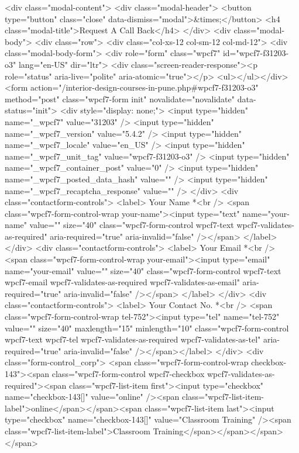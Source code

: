 {{{{{{{<div class="modal-content">
<div class="modal-header">
<button type="button" class="close" data-dismiss="modal">&times;</button>
<h4 class="modal-title">Request A Call Back</h4>
</div>
<div class="modal-body">
<div class="row">
<div class="col-xs-12 col-sm-12 col-md-12">
<div class="modal-body-form">
<div role="form" class="wpcf7" id="wpcf7-f31203-o3" lang="en-US" dir="ltr">
<div class="screen-reader-response"><p role="status" aria-live="polite" aria-atomic="true"></p> <ul></ul></div>
<form action="/interior-design-courses-in-pune.php#wpcf7-f31203-o3" method="post" class="wpcf7-form init" novalidate="novalidate" data-status="init">
<div style="display: none;">
<input type="hidden" name="_wpcf7" value="31203" />
<input type="hidden" name="_wpcf7_version" value="5.4.2" />
<input type="hidden" name="_wpcf7_locale" value="en_US" />
<input type="hidden" name="_wpcf7_unit_tag" value="wpcf7-f31203-o3" />
<input type="hidden" name="_wpcf7_container_post" value="0" />
<input type="hidden" name="_wpcf7_posted_data_hash" value="" />
<input type="hidden" name="_wpcf7_recaptcha_response" value="" />
</div>
<div class="contactform-controls">
<label> Your Name *<br />
<span class="wpcf7-form-control-wrap your-name"><input type="text" name="your-name" value="" size="40" class="wpcf7-form-control wpcf7-text wpcf7-validates-as-required" aria-required="true" aria-invalid="false" /></span> </label>
</div>
<div class="contactform-controls">
<label> Your Email *<br />
<span class="wpcf7-form-control-wrap your-email"><input type="email" name="your-email" value="" size="40" class="wpcf7-form-control wpcf7-text wpcf7-email wpcf7-validates-as-required wpcf7-validates-as-email" aria-required="true" aria-invalid="false" /></span> </label>
</div>
<div class="contactform-controls">
<label> Your Contact No. *<br />
<span class="wpcf7-form-control-wrap tel-752"><input type="tel" name="tel-752" value="" size="40" maxlength="15" minlength="10" class="wpcf7-form-control wpcf7-text wpcf7-tel wpcf7-validates-as-required wpcf7-validates-as-tel" aria-required="true" aria-invalid="false" /></span></label>
</div>
<div class="form-control_corp">
<span class="wpcf7-form-control-wrap checkbox-143"><span class="wpcf7-form-control wpcf7-checkbox wpcf7-validates-as-required"><span class="wpcf7-list-item first"><input type="checkbox" name="checkbox-143[]" value="online" /><span class="wpcf7-list-item-label">online</span></span><span class="wpcf7-list-item last"><input type="checkbox" name="checkbox-143[]" value="Classroom Training" /><span class="wpcf7-list-item-label">Classroom Training</span></span></span></span>
}}}}}}}
